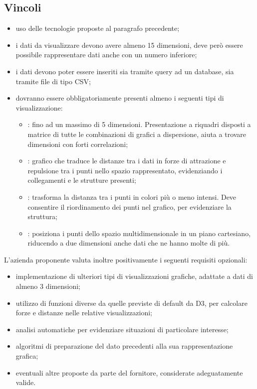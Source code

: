 \subsection{Vincoli}
\begin{itemize}
\item uso delle tecnologie proposte al paragrafo precedente;
\item i dati da visualizzare devono avere almeno 15 dimensioni, deve però essere possibile rappresentare dati anche con un numero inferiore;
\item i dati devono poter essere inseriti sia tramite query ad un database, sia tramite file di tipo CSV;
\item dovranno essere obbligatoriamente presenti almeno i seguenti tipi di visualizzazione:
\begin{itemize}
\item {}: fino ad un massimo di 5 dimensioni. Presentazione a riquadri disposti a matrice di tutte le combinazioni di grafici a dispersione, aiuta a trovare dimensioni con forti correlazioni;
\item {}: grafico che traduce le distanze tra i dati in forze di attrazione e repulsione tra i punti nello spazio rappresentato, evidenziando i collegamenti e le strutture presenti;
\item {}: trasforma la distanza tra i punti in colori più o meno intensi. Deve consentire il riordinamento dei punti nel grafico, per evidenziare la struttura;
\item {}: posiziona i punti dello spazio multidimensionale in un piano cartesiano, riducendo a due dimensioni anche dati che ne hanno molte di più.
\end{itemize}
\end{itemize}
L’azienda proponente valuta inoltre positivamente i seguenti requisiti opzionali:
\begin{itemize}    
\item implementazione di ulteriori tipi di visualizzazioni grafiche, adattate a dati di almeno 3 dimensioni;
\item utilizzo di funzioni diverse da quelle previste di default da D3, per calcolare forze e distanze nelle relative visualizzazioni;
\item analisi automatiche per evidenziare situazioni di particolare interesse;
\item algoritmi di preparazione del dato precedenti alla sua rappresentazione grafica;
\item eventuali altre proposte da parte del fornitore, considerate adeguatamente valide.
\end{itemize}


